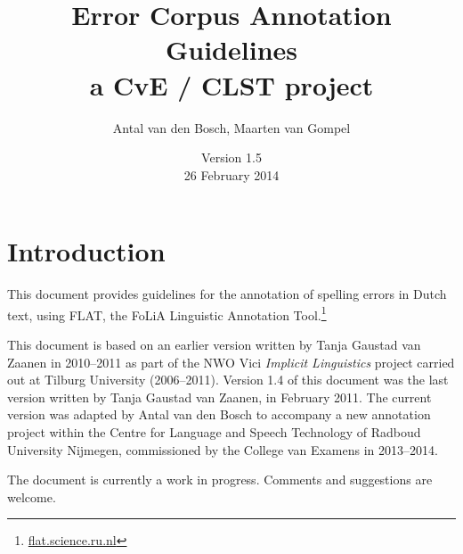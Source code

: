 \documentclass[a4paper,11pt]{article}
\title{Error Corpus Annotation Guidelines \\ a CvE / CLST project}
\author{Antal van den Bosch, Maarten van Gompel}
\date{Version 1.5 \\ 26 February 2014}
\begin{document}
\maketitle

\newpage

\section{Introduction}

This document provides guidelines for the annotation of spelling
errors in Dutch text, using FLAT, the FoLiA Linguistic Annotation
Tool.\footnote{\url{flat.science.ru.nl}}


This document is based on an earlier version written by Tanja Gaustad
van Zaanen in 2010--2011 as part of the NWO Vici {\em Implicit
  Linguistics} project carried out at Tilburg University
(2006--2011). Version 1.4 of this document was the last version
written by Tanja Gaustad van Zaanen, in February 2011. The current
version was adapted by Antal van den Bosch to accompany a new
annotation project within the Centre for Language and Speech
Technology of Radboud University Nijmegen, commissioned by the College
van Examens in 2013--2014.

The document is currently a work in progress. Comments and suggestions
are welcome.


\end{document}
